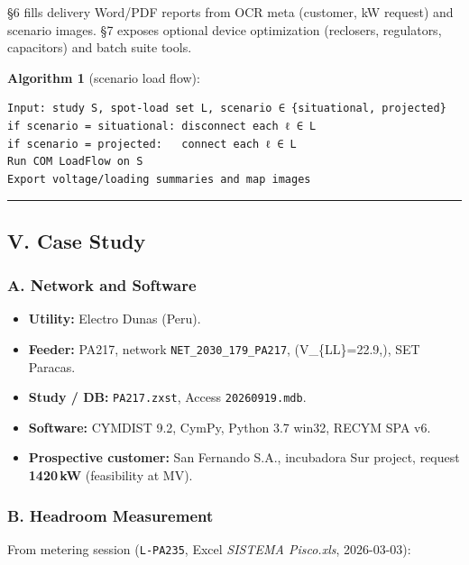 \documentclass[
  11pt,
]{article}
\providecommand{\tightlist}{%
  \setlength{\itemsep}{0pt}\setlength{\parskip}{0pt}}
\begin{document}
§6 fills delivery Word/PDF reports from OCR meta (customer, kW request)
and scenario images. §7 exposes optional device optimization (reclosers,
regulators, capacitors) and batch suite tools.

\textbf{Algorithm 1} (scenario load flow):

\begin{verbatim}
Input: study S, spot-load set L, scenario ∈ {situational, projected}
if scenario = situational: disconnect each ℓ ∈ L
if scenario = projected:   connect each ℓ ∈ L
Run COM LoadFlow on S
Export voltage/loading summaries and map images
\end{verbatim}

\begin{center}\rule{0.5\linewidth}{0.5pt}\end{center}

\subsection{V. Case Study}\label{v.-case-study}

\subsubsection{A. Network and Software}\label{a.-network-and-software}

\begin{itemize}
\tightlist
\item
  \textbf{Utility:} Electro Dunas (Peru).
\item
  \textbf{Feeder:} PA217, network \texttt{NET\_2030\_179\_PA217},
  (V\_\{LL\}=22.9,), SET Paracas.
\item
  \textbf{Study / DB:} \texttt{PA217.zxst}, Access
  \texttt{20260919.mdb}.
\item
  \textbf{Software:} CYMDIST 9.2, CymPy, Python 3.7 win32, RECYM SPA v6.
\item
  \textbf{Prospective customer:} San Fernando S.A., incubadora Sur
  project, request \textbf{1420\,kW} (feasibility at MV).
\end{itemize}

\subsubsection{B. Headroom Measurement}\label{b.-headroom-measurement}

From metering session (\texttt{L-PA235}, Excel \emph{SISTEMA Pisco.xls},
2026-03-03):
\end{document}

